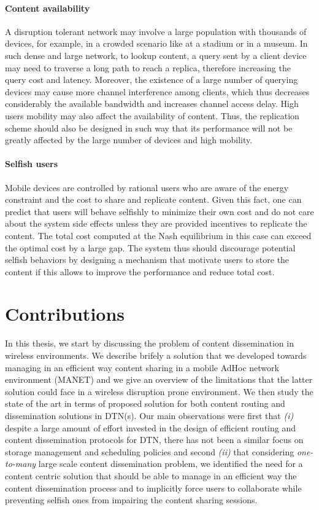 \paragraph{Content availability}

A disruption tolerant network may involve a large population with thousands of devices, for example, in a crowded scenario like at a stadium or in a museum. In such dense and
large network, to lookup content, a query sent by a client device may need to traverse a long path to reach a replica, therefore increasing the query cost and latency. Moreover, the
existence of a large number of querying devices may cause more channel interference among clients, which thus decreases considerably the available bandwidth and increases channel
access delay. High users mobility may also affect the availability of content. Thus, the replication scheme should also be designed in such way that its performance will not be greatly affected by the large number of devices and high mobility.

\paragraph{Selfish users}

Mobile devices are controlled by rational users who are aware of the energy constraint and the cost to share and replicate content. Given this fact, one can predict that users will behave selfishly to minimize their own cost and do not care about the system side effects unless they are provided incentives to replicate the content. The total cost computed at the Nash equilibrium in this case can exceed the optimal cost by a large gap. The system thus should discourage potential selfish behaviors by designing a mechanism that motivate users to store the content if this allows to improve the performance and reduce total cost.

\section{Contributions}

In this thesis, we start by discussing the problem of content dissemination in wireless environments. We describe brifely a solution that we developed towards managing in an efficient way content sharing in a mobile AdHoc network environment (MANET) and we give an overview of the limitations that the latter solution could face in a wireless disruption prone environment. We then study the state of the art in terms of proposed solution for both content routing and dissemination solutions in DTN(s). Our main observations were first that \emph{(i)} despite a large amount of effort invested in the design of efficient routing and content dissemination protocols for DTN, there has not been a similar focus on storage management and scheduling policies and second \emph{(ii)} that considering \emph{one-to-many} large scale content dissemination problem, we identified the need for a content centric solution that should be able to manage in an efficient way the content dissemination process and to implicitly force users to collaborate while preventing selfish ones from impairing the content sharing sessions. 

